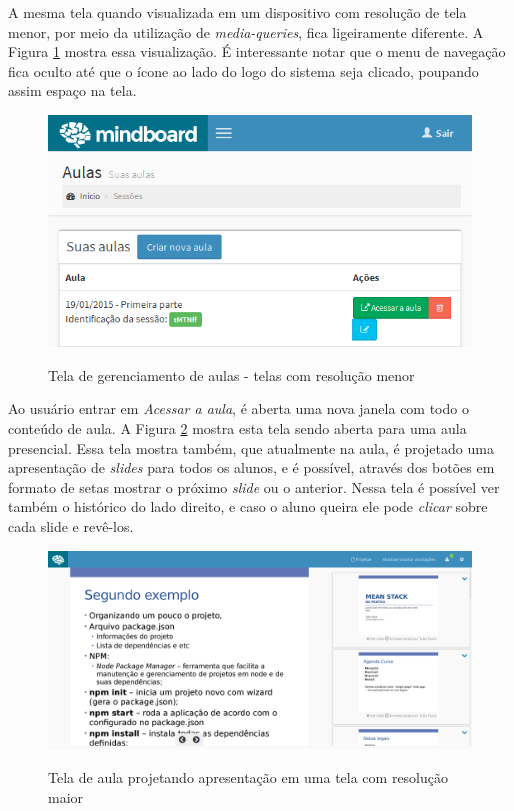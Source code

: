 A mesma tela quando visualizada em um dispositivo com resolução de tela menor, por meio da utilização de \emph{media-queries}, fica ligeiramente diferente. A Figura \ref{fig:tela_aulas_mob} mostra essa visualização. É interessante notar que o menu de navegação fica oculto até que o ícone ao lado do logo do sistema seja clicado, poupando assim espaço na tela.

\begin{figure}[h]
\centering
\caption{Tela de gerenciamento de aulas - telas com resolução menor}
\includegraphics[width=1.0\textwidth]{imgs/tela_aulas_mob_paisagem.png} 
\label{fig:tela_aulas_mob} 
\end{figure}

Ao usuário entrar em \emph{Acessar a aula}, é aberta uma nova janela com todo o conteúdo de aula. A Figura \ref{fig:tela_aula_pc} mostra esta tela sendo aberta para uma aula presencial. Essa tela mostra também, que atualmente na aula, é projetado uma apresentação de \emph{slides} para todos os alunos, e é possível, através dos botões em formato de setas mostrar o próximo \emph{slide} ou o anterior. Nessa tela é possível ver também o histórico do lado direito, e caso o aluno queira ele pode \emph{clicar} sobre cada slide e revê-los.

\begin{figure}[h]
\centering
\caption{Tela de aula projetando apresentação em uma tela com resolução maior}
\includegraphics[width=1.0\textwidth]{imgs/tela_aula_pc.png} 
\label{fig:tela_aula_pc} 
\end{figure}

